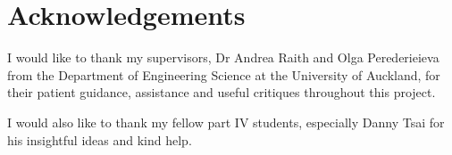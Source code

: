 \chapter*{Acknowledgements}
\thispagestyle{empty}
I would like to thank my supervisors, Dr Andrea Raith and Olga Perederieieva from the Department of Engineering Science at the University of Auckland,
for their patient guidance, assistance and useful critiques throughout this project.

I would also like to thank my fellow part IV students, especially Danny Tsai for his insightful ideas and kind help.
